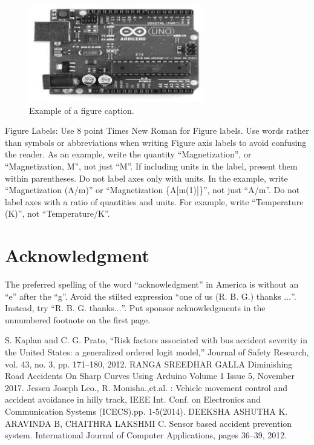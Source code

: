 \documentclass[conference]{IEEEtran}
\begin{document}
    \begin{figure}[htbp]
        \centerline{\includegraphics{fig1.png}}
        \caption{Example of a figure caption.}
        \label{fig}
    \end{figure}

    Figure Labels: Use 8 point Times New Roman for Figure labels. Use words
    rather than symbols or abbreviations when writing Figure axis labels to
    avoid confusing the reader. As an example, write the quantity
    ``Magnetization'', or ``Magnetization, M'', not just ``M''. If including
    units in the label, present them within parentheses. Do not label axes only
    with units. In the example, write ``Magnetization (A/m)'' or ``Magnetization
    \{A[m(1)]\}'', not just ``A/m''. Do not label axes with a ratio of
    quantities and units. For example, write ``Temperature (K)'', not
    ``Temperature/K''.

    \section*{Acknowledgment}

    The preferred spelling of the word ``acknowledgment'' in America is without
    an ``e'' after the ``g''. Avoid the stilted expression ``one of us (R. B.
    G.) thanks $\ldots$''. Instead, try ``R. B. G. thanks$\ldots$''. Put sponsor
    acknowledgments in the unnumbered footnote on the first page.


    \begin{thebibliography}{00}
         S. Kaplan and C. G. Prato, “Risk factors associated with bus accident severity in the United States: a generalized ordered logit model,” Journal of Safety
        Research, vol. 43, no. 3, pp. 171–180, 2012.
         RANGA SREEDHAR GALLA Diminishing Road Accidents On Sharp Curves Using Arduino Volume 1 Issue 5, November 2017.
         Jessen Joseph Leo., R. Monisha.,et.al. : Vehicle movement control and accident avoidance in hilly track, IEEE Int. Conf. on Electronics and Communication
        Systems (ICECS).pp. 1-5(2014).
         DEEKSHA ASHUTHA K. ARAVINDA B, CHAITHRA LAKSHMI C. Sensor based accident prevention system. International Journal of Computer
        Applications, pages 36–39, 2012.
        \end{thebibliography}
\end{document}
